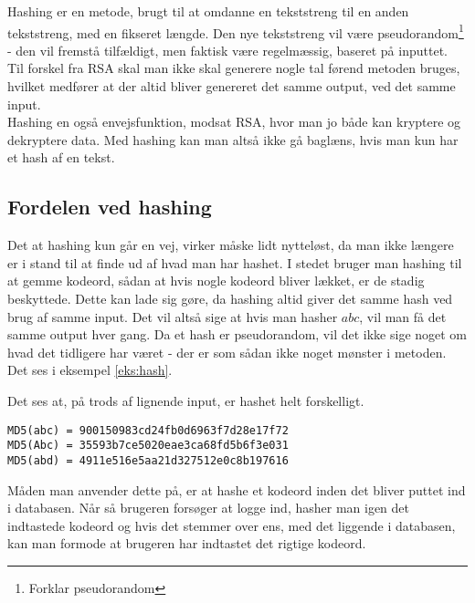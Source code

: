 Hashing er en metode, brugt til at omdanne en tekststreng til en anden tekststreng, med en fikseret længde.
Den nye tekststreng vil være pseudorandom\footnote{Forklar pseudorandom} - den vil fremstå tilfældigt, men faktisk være regelmæssig, baseret på inputtet.
Til forskel fra RSA skal man ikke skal generere nogle tal førend metoden bruges, hvilket medfører at der altid bliver genereret det samme output, ved det samme input.
\\
Hashing en også envejsfunktion, modsat RSA, hvor man jo både kan kryptere og dekryptere data.
Med hashing kan man altså ikke gå baglæns, hvis man kun har et hash af en tekst.


    \subsection{Fordelen ved hashing}
    Det at hashing kun går en vej, virker måske lidt nytteløst, da man ikke længere er i stand til at finde ud af hvad man har hashet.
    I stedet bruger man hashing til at gemme kodeord, sådan at hvis nogle kodeord bliver lækket, er de stadig beskyttede.
    Dette kan lade sig gøre, da hashing altid giver det samme hash ved brug af samme input.
    Det vil altså sige at hvis man hasher \(abc\), vil man få det samme output hver gang.
    Da et hash er pseudorandom, vil det ikke sige noget om hvad det tidligere har været - der er som sådan ikke noget mønster i metoden.
    Det ses i eksempel \ref{eks:hash}.


    \begin{eks}
        Det ses at, på trods af lignende input, er hashet helt forskelligt.
        \begin{center}
            \texttt{MD5(abc) = 900150983cd24fb0d6963f7d28e17f72}\\
            \texttt{MD5(Abc) = 35593b7ce5020eae3ca68fd5b6f3e031}\\
            \texttt{MD5(abd) = 4911e516e5aa21d327512e0c8b197616}\\
        \end{center}
        \label{eks:hash}

    \end{eks}

    \noindent
    Måden man anvender dette på, er at hashe et kodeord inden det bliver puttet ind i databasen.
    Når så brugeren forsøger at logge ind, hasher man igen det indtastede kodeord og hvis det stemmer over ens, med det liggende i databasen, kan man formode at brugeren har indtastet det rigtige kodeord.
    \\


